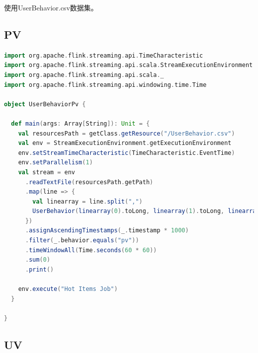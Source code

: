 \documentclass[oneside]{ctexbook}
\begin{document}
使用UserBehavior.csv数据集。

\subsection{PV}

\begin{lstlisting}[language=scala]
import org.apache.flink.streaming.api.TimeCharacteristic
import org.apache.flink.streaming.api.scala.StreamExecutionEnvironment
import org.apache.flink.streaming.api.scala._
import org.apache.flink.streaming.api.windowing.time.Time

object UserBehaviorPv {

  def main(args: Array[String]): Unit = {
    val resourcesPath = getClass.getResource("/UserBehavior.csv")
    val env = StreamExecutionEnvironment.getExecutionEnvironment
    env.setStreamTimeCharacteristic(TimeCharacteristic.EventTime)
    env.setParallelism(1)
    val stream = env
      .readTextFile(resourcesPath.getPath)
      .map(line => {
        val linearray = line.split(",")
        UserBehavior(linearray(0).toLong, linearray(1).toLong, linearray(2).toInt, linearray(3), linearray(4).toLong)
      })
      .assignAscendingTimestamps(_.timestamp * 1000)
      .filter(_.behavior.equals("pv"))
      .timeWindowAll(Time.seconds(60 * 60))
      .sum(0)
      .print()

    env.execute("Hot Items Job")
  }

}
\end{lstlisting}

\subsection{UV}
\end{document}
